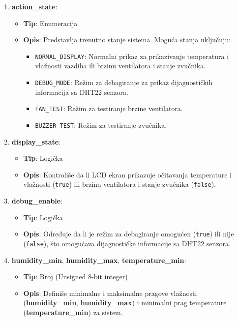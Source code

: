 \documentclass[a4paper, 12pt]{article}
\begin{document}
\begin{enumerate}
    \item \textbf{action\_state}:
        \begin{itemize}
            \item \textbf{Tip}: Enumeracija
            \item \textbf{Opis}: Predstavlja trenutno stanje sistema. Moguća stanja uključuju:
                \begin{itemize}
                    \item \texttt{NORMAL\_DISPLAY}: Normalni prikaz za prikazivanje temperatura i vlažnosti vazdiha ili brzinu ventilatora i stanje zvučnika.
                    \item \texttt{DEBUG\_MODE}: Režim za debagiranje za prikaz dijagnostičkih informacija sa DHT22 senzora.
                    \item \texttt{FAN\_TEST}: Režim za testiranje brzine ventilatora.
                    \item \texttt{BUZZER\_TEST}: Režim za testiranje zvučnika.
                \end{itemize}
        \end{itemize}
        
    \item \textbf{display\_state}:
        \begin{itemize}
            \item \textbf{Tip}: Logička
            \item \textbf{Opis}: Kontroliše da li LCD ekran prikazuje očitavanja temperature i vlažnosti (\texttt{true}) ili brzinu ventilatora i stanje zvučnika (\texttt{false}).
        \end{itemize}
        
    \item \textbf{debug\_enable}:
        \begin{itemize}
            \item \textbf{Tip}: Logička
            \item \textbf{Opis}: Određuje da li je režim za debagiranje omogućen (\texttt{true}) ili nije (\texttt{false}), što omogućava dijagnostičke informacije sa DHT22 senzora.
        \end{itemize}
        
    \item \textbf{humidity\_min}, \textbf{humidity\_max}, \textbf{temperature\_min}:
        \begin{itemize}
            \item \textbf{Tip}: Broj (Unsigned 8-bit integer)
            \item \textbf{Opis}: Definiše minimalne i maksimalne pragove vlažnosti (\textbf{humidity\_min}, \textbf{humidity\_max}) i minimalni prag temperature (\textbf{temperature\_min}) za sistem.
        \end{itemize}
        

\end{enumerate}
\end{document}

